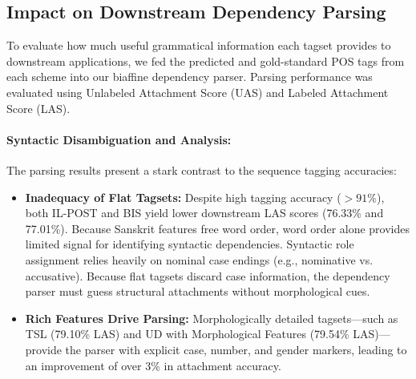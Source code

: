 \documentclass[11pt,a4paper]{article}
\begin{document}
\subsection{Impact on Downstream Dependency Parsing}

To evaluate how much useful grammatical information each tagset provides to downstream applications, we fed the predicted and gold-standard POS tags from each scheme into our biaffine dependency parser. Parsing performance was evaluated using Unlabeled Attachment Score (UAS) and Labeled Attachment Score (LAS).

\begin{table}[htbp]
\centering
\caption{Dependency Parsing Performance (UAS / LAS) using POS Input.}
\label{tab:parsing_results}
\end{table}

\paragraph{Syntactic Disambiguation and Analysis:}
The parsing results present a stark contrast to the sequence tagging accuracies:
\begin{itemize}[leftmargin=1.5em, itemsep=0.2em]
    \item \textbf{Inadequacy of Flat Tagsets:} Despite high tagging accuracy ($>91\%$), both IL-POST and BIS yield lower downstream LAS scores (76.33\% and 77.01\%). Because Sanskrit features free word order, word order alone provides limited signal for identifying syntactic dependencies. Syntactic role assignment relies heavily on nominal case endings (e.g., nominative vs. accusative). Because flat tagsets discard case information, the dependency parser must guess structural attachments without morphological cues.
    \item \textbf{Rich Features Drive Parsing:} Morphologically detailed tagsets---such as TSL (79.10\% LAS) and UD with Morphological Features (79.54\% LAS)---provide the parser with explicit case, number, and gender markers, leading to an improvement of over 3\% in attachment accuracy.
\end{itemize}
\end{document}
